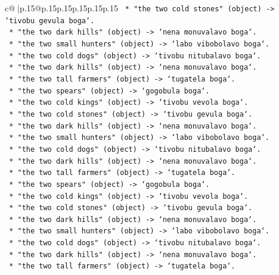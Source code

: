 \documentclass{article}
\begin{document}
{\begin{supertabular}{c@{$\;$}|p{.15\linewidth}@{}p{.15\linewidth}p{.15\linewidth}p{.15\linewidth}p{.15\linewidth}p{.15\linewidth}}
{{{\texttt{        *   "the two cold stones" (object) {-}> `tivobu gevula boga`.} \\
\texttt{        *   "the two dark hills" (object) {-}> `nena monuvalavo boga`.} \\
\texttt{        *   "the two small hunters" (object) {-}> `labo vibobolavo boga`.} \\
\texttt{        *   "the two cold dogs" (object) {-}> `tivobu nitubalavo boga`.} \\
\texttt{        *   "the two dark hills" (object) {-}> `nena monuvalavo boga`.} \\
\texttt{        *   "the two tall farmers" (object) {-}> `tugatela boga`.} \\
\texttt{        *   "the two spears" (object) {-}> `gogobula boga`.} \\
\texttt{        *   "the two cold kings" (object) {-}> `tivobu vevola boga`.} \\
\texttt{        *   "the two cold stones" (object) {-}> `tivobu gevula boga`.} \\
\texttt{        *   "the two dark hills" (object) {-}> `nena monuvalavo boga`.} \\
\texttt{        *   "the two small hunters" (object) {-}> `labo vibobolavo boga`.} \\
\texttt{        *   "the two cold dogs" (object) {-}> `tivobu nitubalavo boga`.} \\
\texttt{        *   "the two dark hills" (object) {-}> `nena monuvalavo boga`.} \\
\texttt{        *   "the two tall farmers" (object) {-}> `tugatela boga`.} \\
\texttt{        *   "the two spears" (object) {-}> `gogobula boga`.} \\
\texttt{        *   "the two cold kings" (object) {-}> `tivobu vevola boga`.} \\
\texttt{        *   "the two cold stones" (object) {-}> `tivobu gevula boga`.} \\
\texttt{        *   "the two dark hills" (object) {-}> `nena monuvalavo boga`.} \\
\texttt{        *   "the two small hunters" (object) {-}> `labo vibobolavo boga`.} \\
\texttt{        *   "the two cold dogs" (object) {-}> `tivobu nitubalavo boga`.} \\
\texttt{        *   "the two dark hills" (object) {-}> `nena monuvalavo boga`.} \\
\texttt{        *   "the two tall farmers" (object) {-}> `tugatela boga`.} \\
}}}
\end{supertabular}}
\end{document}
